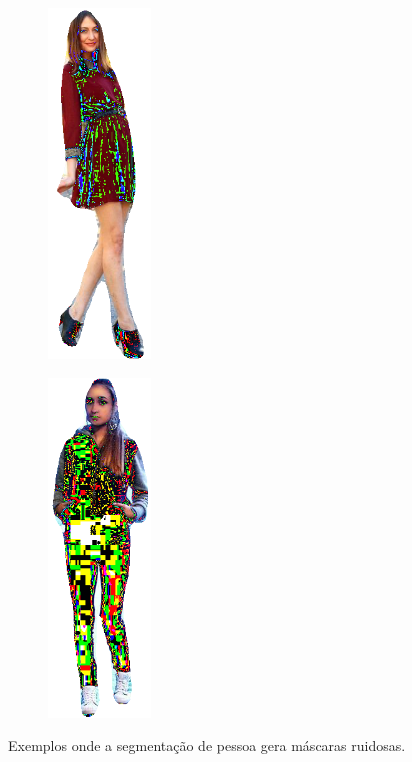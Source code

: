 \documentclass[12pt]{report}
\begin{document}
\begin{figure}
  \centering
  \begin{subfigure}[b]{0.4\textwidth}
  \centering
    \includegraphics[width=0.3\textwidth]{images/resultados/159.png}
    \label{fig:}
  \end{subfigure}
  \centering
  \begin{subfigure}[b]{0.4\textwidth}
  \centering
    \includegraphics[width=0.3\textwidth]{images/resultados/1532.png}
    \label{fig:}
  \end{subfigure}
  \caption{Exemplos onde a segmentação de pessoa gera máscaras ruidosas.}
  \label{fig:segsruins}
\end{figure}
\end{document}
